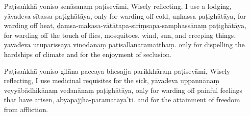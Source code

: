 \begin{chantsubsection}

  \chantlineinline
    {Paṭisaṅkhā yoniso senāsanaṃ paṭisevāmi,}
    {Wisely reflecting, I use a lodging,}
  \chantlineinline
    {yāvadeva sītassa paṭighātāya,}
    {only for warding off cold,}
  \chantlineinline
    {uṇhassa paṭighātāya,}
    {for warding off heat,}
  \chantlineinline
    {ḍaṃsa-makasa-vātātapa-siriṃsapa-samphassānaṃ paṭighātāya,}
    {for warding off the touch of flies, mosquitoes, wind, sun, and creeping things,}
  \chantlineinline
    {yāvadeva utuparissaya vinodanaṃ paṭisallānārāmatthaṃ.}
    {only for dispelling the hardships of climate and for the enjoyment of seclusion.}

\chantgap

  \chantlineinline
    {Paṭisaṅkhā yoniso gilāna-paccaya-bhesajja-parikkhāraṃ paṭisevāmi,}
    {Wisely reflecting, I use medicinal requisites for the sick,}
  \chantlineinline
    {yāvadeva uppannānaṃ veyyābādhikānaṃ vedanānaṃ paṭighātāya,}
    {only for warding off painful feelings that have arisen,}
  \chantlineinline
    {abyāpajjha-paramatāyā'ti.}
    {and for the attainment of freedom from affliction.}
\end{chantsubsection}
